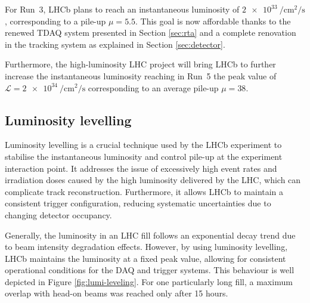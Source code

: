 For Run~3, LHCb plans to reach an instantaneous luminosity of $\SI{2e33}{\per\centi\meter\squared\per\second}$, corresponding to a pile-up $\mu=5.5$.
This goal is now affordable thanks to the renewed TDAQ system presented in Section \ref{sec:rta} and a complete renovation in the tracking system as explained in Section \ref{sec:detector}. 

Furthermore, the high-luminosity LHC project will bring LHCb to further increase the instantaneous luminosity reaching in Run~5 the peak value of $\mathcal{L}=\SI{2e34}{\per\centi\meter\squared\per\second}$ corresponding to an average pile-up $\mu=38$.

\subsection{Luminosity levelling}\label{sec:lumi_levelling}

Luminosity levelling is a crucial technique used by the LHCb experiment to stabilise the instantaneous luminosity and control pile-up at the experiment interaction point. It addresses the issue of excessively high event rates and irradiation doses caused by the high luminosity delivered by the LHC, which can complicate track reconstruction. Furthermore, it allows LHCb to maintain a consistent trigger configuration, reducing systematic uncertainties due to changing detector occupancy.

Generally, the luminosity in an LHC fill follows an exponential decay trend due to beam intensity degradation effects. However, by using luminosity levelling, LHCb maintains the luminosity at a fixed peak value, allowing for consistent operational conditions for the DAQ and trigger systems.  This behaviour is well depicted in Figure \ref{fig:lumi-leveling}. For one particularly long fill, a maximum overlap with head-on beams was reached only after 15 hours. 

